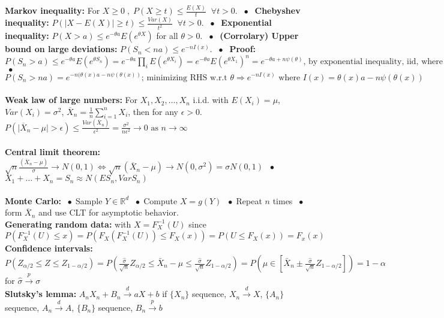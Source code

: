 \documentclass[9pt]{extarticle}
\newcommand{\abs}[1]{\lvert#1\rvert}
\newcommand*\bspace{$\; \bullet \;$}
\begin{document}
\textbf{Markov inequality: } For $X\geq 0 \;, \;P(X \geq t) \leq \frac{E(X)}{t} \; \; \forall t>0$. \bspace 
\textbf{Chebyshev inequality: } $P(\abs{X - E(X)} \geq t) \leq \frac{Var(X)}{t^2} \; \; \forall t > 0$. \bspace 
\textbf{Exponential inequality: } $P(X > a) \leq e^{-\theta a} E(e^{\theta X})$ for all $\theta > 0$. \bspace
\textbf{(Corrolary) Upper bound on large deviations: } $P(S_n < na) \leq e^{-nI(x)}$. \bspace
\textbf{Proof: } $P(S_n > a) \leq e^{-\theta a} E(e^{\theta S_n}) = e^{-\theta a} \prod_i E(e^{\theta X_i}) = e^{-\theta a} E(e^{\theta X_1})^n = e^{-\theta a + n \psi(\theta)} \textrm{, by exponential inequality, iid, where } \psi(\theta) = \log{Ee^{\theta X_1}}$ \bspace 
$P(S_n > na) = e^{-n(\theta(x) a - n \psi(\theta(x))} \textrm{; minimizing RHS w.r.t } \theta \Longrightarrow e^{-nI(x)} \textrm{ where } I(x) = \theta(x) a - n \psi(\theta(x))$\\\\
\textbf{Weak law of large numbers:} For $X_1, X_2, \dots, X_n$ i.i.d. with $E(X_i) = \mu$,  $Var(X_i) = \sigma^2$, $\overline{X}_n = \frac{1}{n}\sum_{i = 1}^n X_i$, then for any $\epsilon > 0$. $P(\abs{\overline{X}_n - \mu} > \epsilon) \leq \frac{Var(\overline{X}_n)}{\epsilon^2} = \frac{\sigma^2}{n\epsilon^2} \rightarrow 0 \textrm{ as } n \rightarrow \infty$\\\\
\textbf{Central limit theorem:} $\sqrt{n}\frac{(\overline{X}_n - \mu)}{\sigma} \longrightarrow N(0, 1) \Longleftrightarrow \sqrt{n}(\overline{X}_n - \mu) \longrightarrow N(0, \sigma^2) = \sigma N(0, 1)$ \bspace $X_1 + \dots + X_n = S_n \approx N(E S_n, Var S_n)$\\\\
\textbf{Monte Carlo: }\bspace Sample $Y \in \mathbb{R}^d$ \bspace Compute $X = g(Y)$ \bspace Repeat $n$ times \bspace form $\overline{X}_n$ and use CLT for asymptotic behavior.\\
\textbf{Generating random data:} with $X = F_X^{-1}(U)$ since $P(F_X^{-1}(U) \leq x) = P(F_X(F_X^{-1}(U)) \leq F_X(x)) = P(U \leq F_X(x)) = F_x(x)$\\
\textbf{Confidence intervals: } $P(Z_{\alpha / 2} \leq Z \leq Z_{1-\alpha / 2}) = P(\frac{\hat{\sigma}}{\sqrt{n}}Z_{\alpha/ 2} \leq \bar{X}_n - \mu \leq \frac{\hat{\sigma}}{\sqrt{n}}Z_{1-\alpha / 2}) = P(\mu \in \left[\bar{X}_n \pm \frac{\hat{\sigma}}{\sqrt{n}}Z_{1-\alpha/2}\right]) = 1-\alpha$ for $\hat{\sigma}\overset{p}{\longrightarrow} \sigma$\\
\textbf{Slutsky's lemma:} $A_nX_n + B_n \overset{d}{\rightarrow} aX + b$ if $\{X_n\}$ sequence, $X_n \overset{d}{\rightarrow} X$,  $\{A_n\}$ sequence, $A_n \overset{d}{\rightarrow} A$, $\{B_n\}$ sequence, $B_n \overset{p}{\rightarrow} b$\\
\end{document}
